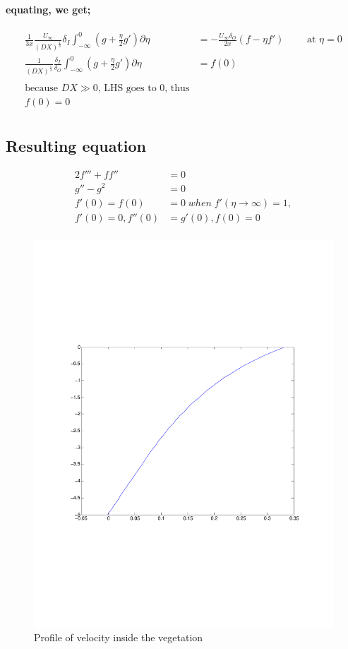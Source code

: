 \documentclass[11pt]{amsart}
\begin{document}
\paragraph{equating, we get;}
\begin{align}
\frac{1}{3x} \frac{U_\infty}{(DX)^\frac{1}{3}} \delta_I \int_{-\infty}^0 (g +\frac{\eta}{2}g') \partial \eta & = - \frac{U_\infty \delta_O}{2x}(f-\eta f') \qquad \text{  at   } \eta=0 \nonumber \\
\frac{1}{(DX)^\frac{1}{3}}\frac{\delta_I}{\delta_O} \int_{-\infty}^0 (g +\frac{\eta}{2}g') \partial \eta & = f(0) \nonumber \\ \nonumber \\
\text{because \(DX \gg 0\), LHS goes to 0, thus} \nonumber \\
f(0) = 0 \nonumber \\ \nonumber
\end{align}
\subsection{Resulting equation} 
\begin{align}
2f''' + ff'' & = 0 \\
g'' - g^2 & = 0 \\
f'(0) = f(0) & = 0 \; when \;  f'(\eta \rightarrow \infty) = 1,  \nonumber \\ \nonumber f'(0) = 0, f''(0) & = g'(0) , f(0) = 0  \\ \nonumber
\end{align}
\begin{figure}
\includegraphics[scale=0.5]{Figures/vegetation}
\caption{ Profile of velocity inside the vegetation }
\end{figure}
\end{document}
